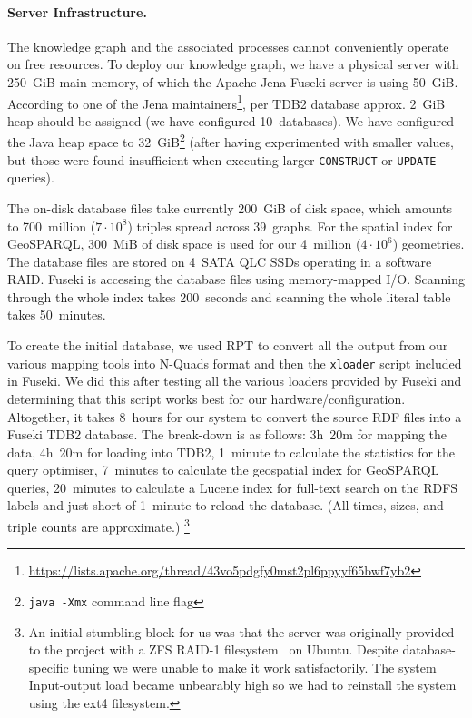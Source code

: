 \documentclass[
hf
]{ceurart}
\begin{document}
\paragraph{Server Infrastructure.}\label{para:infra}
The knowledge graph and the associated processes cannot conveniently operate on free resources. To deploy our knowledge graph, we have a physical server with  250~GiB main memory, of which the Apache Jena Fuseki server is using 50~GiB. According to one of the Jena maintainers\footnote{\url{https://lists.apache.org/thread/43vo5pdgfy0mst2pl6ppyyf65bwf7yb2}}, per TDB2 database approx. 2~GiB heap should be assigned (we have configured 10~databases). We have configured the Java heap space to 32~GiB\footnote{\texttt{java -Xmx} command line flag} (after having experimented with smaller values, but those were found insufficient when executing larger \texttt{CONSTRUCT} or \texttt{UPDATE} queries).

The on-disk database files take currently 200~GiB of disk space, which amounts to 700~million ($7\cdot 10^8$) triples spread across 39~graphs. For the spatial index for GeoSPARQL, 300~MiB of disk space is used for our 4~million ($4\cdot 10^6$) geometries. The database files are stored on 4~SATA QLC SSDs operating in a software RAID. Fuseki is accessing the database files using memory-mapped I/O. Scanning through the whole index takes 200~seconds and scanning the whole literal table takes 50~minutes.

To create the initial database, we used RPT to convert all the output from our various mapping tools into N-Quads format and then the \texttt{xloader} script included in Fuseki. We did this after testing all the various loaders provided by Fuseki and determining that this script works best for our hardware/configuration. Altogether, it takes 8~hours for our system to convert the source RDF files into a Fuseki TDB2 database. The break-down is as follows: 3h~20m for mapping the data, 4h~20m for loading into TDB2, 1~minute to calculate the statistics for the query optimiser, 7~minutes to calculate the geospatial index for GeoSPARQL queries, 20~minutes to calculate a Lucene index for full-text search on the RDFS labels and just short of 1~minute to reload the database. (All times, sizes, and triple counts are approximate.)
%
\footnote{An initial stumbling block for us was that the server was originally provided to the project with a ZFS RAID-1 filesystem~\cite{bonwick2003zettabyte} on Ubuntu. Despite database-specific tuning\footnotemark{} we were unable to make it work satisfactorily. The system Input-output load became unbearably high so we had to reinstall the system using the ext4\footnotemark{} filesystem.}
\addtocounter{footnote}{-2}%
\end{document}

